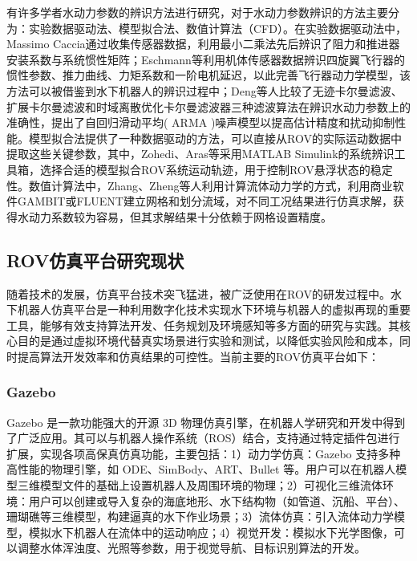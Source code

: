 有许多学者水动力参数的辨识方法进行研究，对于水动力参数辨识的方法主要分为：实验数据驱动法、模型拟合法、数值计算法（CFD）。在实验数据驱动法中，Massimo Caccia\cite{cacciaModelingIdentificationOpenframe2000}通过收集传感器数据，利用最小二乘法先后辨识了阻力和推进器安装系数与系统惯性矩阵；Eschmann等\cite{eschmannDataDrivenSystemIdentification2024}利用机体传感器数据辨识四旋翼飞行器的惯性参数、推力曲线、力矩系数和一阶电机延迟，以此完善飞行器动力学模型，该方法可以被借鉴到水下机器人的辨识过程中；Deng等人\cite{dengIdentificationAutonomousUnderwater2021}比较了无迹卡尔曼滤波、扩展卡尔曼滤波和时域离散优化卡尔曼滤波器三种滤波算法在辨识水动力参数上的准确性，提出了自回归滑动平均( ARMA )噪声模型以提高估计精度和扰动抑制性能。模型拟合法提供了一种数据驱动的方法，可以直接从ROV的实际运动数据中提取这些关键参数，其中，Zohedi\cite{zohediSYSTEMIDENTIFICATIONSI2023}、Aras\cite{arasThrusterModellingUnderwater2013}等采用MATLAB Simulink的系统辨识工具箱，选择合适的模型拟合ROV系统运动轨迹，用于控制ROV悬浮状态的稳定性。数值计算法中，Zhang\cite{zhangStudyImpactProcess2017}、Zheng\cite{zhengStudyHydrodynamicPerformance2017}等人利用计算流体动力学的方式，利用商业软件GAMBIT或FLUENT建立网格和划分流域，对不同工况结果进行仿真求解，获得水动力系数较为容易，但其求解结果十分依赖于网格设置精度。

\subsection{ROV仿真平台研究现状}

随着技术的发展，仿真平台技术突飞猛进，被广泛使用在ROV的研发过程中。水下机器人仿真平台是一种利用数字化技术实现水下环境与机器人的虚拟再现的重要工具，能够有效支持算法开发、任务规划及环境感知等多方面的研究与实践\cite{cookSurveyAUVRobot2014}。其核心目的是通过虚拟环境代替真实场景进行实验和测试，以降低实验风险和成本，同时提高算法开发效率和仿真结果的可控性。当前主要的ROV仿真平台如下：

\subsubsection{Gazebo}

Gazebo 是一款功能强大的开源 3D 物理仿真引擎，在机器人学研究和开发中得到了广泛应用。其可以与机器人操作系统（ROS）结合，支持通过特定插件包进行扩展，实现各项高保真仿真功能，主要包括：1）动力学仿真：Gazebo 支持多种高性能的物理引擎，如 ODE、SimBody、ART、Bullet 等。用户可以在机器人模型三维模型文件的基础上设置机器人及周围环境的物理；2）可视化三维流体环境：用户可以创建或导入复杂的海底地形、水下结构物（如管道、沉船、平台）、珊瑚礁等三维模型，构建逼真的水下作业场景；3）流体仿真：引入流体动力学模型，模拟水下机器人在流体中的运动响应；4）视觉开发：模拟水下光学图像，可以调整水体浑浊度、光照等参数，用于视觉导航、目标识别算法的开发。

